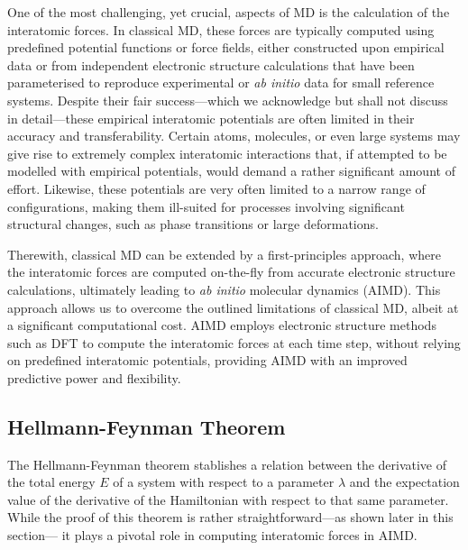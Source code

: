 One of the most challenging, yet crucial, aspects of MD is the calculation of the interatomic forces. In classical MD, these forces are typically computed using predefined potential functions or force fields, either constructed upon empirical data or from independent electronic structure calculations that have been parameterised to reproduce experimental or \emph{ab initio} data for small reference systems. Despite their fair success---which we acknowledge but shall not discuss in detail---these empirical interatomic potentials are often limited in their accuracy and transferability. Certain atoms, molecules, or even large systems may give rise to extremely complex interatomic interactions that, if attempted to be modelled with empirical potentials, would demand a rather significant amount of effort. Likewise, these potentials are very often limited to a narrow range of configurations, making them ill-suited for processes involving significant structural changes, such as phase transitions or large deformations.  

Therewith, classical MD can be extended by a first-principles approach, where the interatomic forces are computed on-the-fly from accurate electronic structure calculations, ultimately leading to \emph{ab initio} molecular dynamics (AIMD). This approach allows us to overcome the outlined limitations of classical MD, albeit at a significant computational cost. AIMD employs electronic structure methods such as DFT to compute the interatomic forces at each time step, without relying on predefined interatomic potentials, providing AIMD with an improved predictive power and flexibility.  


\subsection{Hellmann-Feynman Theorem}
 The Hellmann-Feynman theorem\supercite{Feynman1939, Politzer2018} stablishes a relation between the derivative of the total energy $E$ of a system with respect to a parameter $\lambda$ and the expectation value of the derivative of the Hamiltonian with respect to that same parameter.
 While the proof of this theorem is rather straightforward---as shown later in this section---
 it plays a pivotal role in computing interatomic forces in AIMD. 
 
